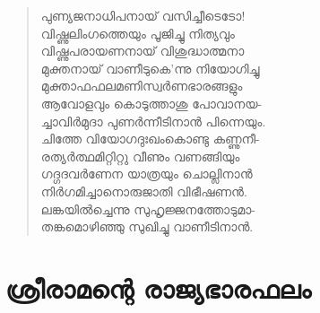 \begin{verse}
പുണ്യജനാധിപനായ് വസിച്ചീടെടോ!\\
വിഷ്ണുലിംഗത്തെയും പൂജിച്ചു നിത്യവും\\
വിഷ്ണുപരായണനായ് വിശുദ്ധാത്മനാ\\
മുക്തനായ് വാണീടുകെ’ന്നു നിയോഗിച്ചു\\
മുക്താഫഫലമണിസ്വര്‍ണഭാരങ്ങളും\\
ആവോളവും കൊടുത്താശു പോവാനയ-\\
ച്ചാവിര്‍മുദാ പുണര്‍ന്നീടിനാന്‍ പിന്നെയും.\\
ചിത്തേ വിയോഗദുഃഖംകൊണ്ടു കണ്ണുനീ-\\
രത്യര്‍ത്ഥമിറ്റിറ്റു വീണും വണങ്ങിയും\\
ഗദ്ഗദവര്‍ണേന യാത്രയും ചൊല്ലിനാന്‍\\
നിര്‍ഗമിച്ചാനൊരുജാതി വിഭീഷണന്‍.\\
ലങ്കയില്‍ച്ചെന്നു സുഹൃജ്ജനത്തോടുമാ-\\
തങ്കമൊഴിഞ്ഞു സുഖിച്ചു വാണീടിനാന്‍.
\end{verse}


\section{ശ്രീരാമന്റെ രാജ്യഭാരഫലം}


